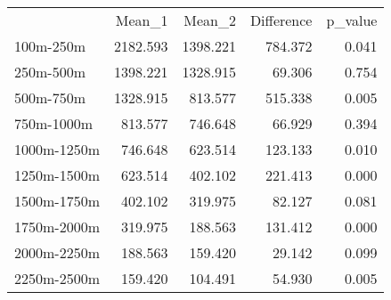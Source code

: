 \documentclass{article}
\begin{document}
\begin{table}[!h]
\centering
\begin{tabular}{lllll}
\cline{1-5}
\multicolumn{1}{c}{} &
  \multicolumn{1}{|r}{Mean\_1} &
  \multicolumn{1}{r}{Mean\_2} &
  \multicolumn{1}{r}{Difference} &
  \multicolumn{1}{r}{p\_value} \\
\cline{1-5}
\multicolumn{1}{l}{100m-250m} &
  \multicolumn{1}{|r}{2182.593} &
  \multicolumn{1}{r}{1398.221} &
  \multicolumn{1}{r}{784.372} &
  \multicolumn{1}{r}{0.041} \\
\multicolumn{1}{l}{250m-500m} &
  \multicolumn{1}{|r}{1398.221} &
  \multicolumn{1}{r}{1328.915} &
  \multicolumn{1}{r}{69.306} &
  \multicolumn{1}{r}{0.754} \\
\multicolumn{1}{l}{500m-750m} &
  \multicolumn{1}{|r}{1328.915} &
  \multicolumn{1}{r}{813.577} &
  \multicolumn{1}{r}{515.338} &
  \multicolumn{1}{r}{0.005} \\
\multicolumn{1}{l}{750m-1000m} &
  \multicolumn{1}{|r}{813.577} &
  \multicolumn{1}{r}{746.648} &
  \multicolumn{1}{r}{66.929} &
  \multicolumn{1}{r}{0.394} \\
\multicolumn{1}{l}{1000m-1250m} &
  \multicolumn{1}{|r}{746.648} &
  \multicolumn{1}{r}{623.514} &
  \multicolumn{1}{r}{123.133} &
  \multicolumn{1}{r}{0.010} \\
\multicolumn{1}{l}{1250m-1500m} &
  \multicolumn{1}{|r}{623.514} &
  \multicolumn{1}{r}{402.102} &
  \multicolumn{1}{r}{221.413} &
  \multicolumn{1}{r}{0.000} \\
\multicolumn{1}{l}{1500m-1750m} &
  \multicolumn{1}{|r}{402.102} &
  \multicolumn{1}{r}{319.975} &
  \multicolumn{1}{r}{82.127} &
  \multicolumn{1}{r}{0.081} \\
\multicolumn{1}{l}{1750m-2000m} &
  \multicolumn{1}{|r}{319.975} &
  \multicolumn{1}{r}{188.563} &
  \multicolumn{1}{r}{131.412} &
  \multicolumn{1}{r}{0.000} \\
\multicolumn{1}{l}{2000m-2250m} &
  \multicolumn{1}{|r}{188.563} &
  \multicolumn{1}{r}{159.420} &
  \multicolumn{1}{r}{29.142} &
  \multicolumn{1}{r}{0.099} \\
\multicolumn{1}{l}{2250m-2500m} &
  \multicolumn{1}{|r}{159.420} &
  \multicolumn{1}{r}{104.491} &
  \multicolumn{1}{r}{54.930} &
  \multicolumn{1}{r}{0.005} \\
\cline{1-5}
\end{tabular}
\end{table}
\end{document}
